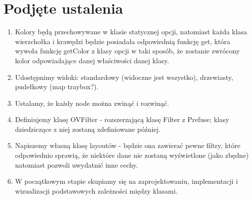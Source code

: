 \documentclass[a4paper,10pt]{article}
\begin{document}
\section{Podjęte ustalenia}
\begin{enumerate}
\item Kolory będą przechowywane w klasie statycznej opcji, natomiast każda klasa wierzchołka i krawędzi będzie posiadała odpowiednią funkcję get, która wywoła funkcję getColor z klasy opcji w taki sposób, że zostanie zwrócony kolor odpowiadające danej właściwości danej klasy. 
\item Udostępnimy widoki: standardowy (widoczne jest wszystko), drzewiasty, pudełkowy (map traybox?).
\item Ustalamy, że każdy node można zwinąć i rozwinąć.
\item Definiujemy klasę OVFilter - rozszerzającą klasę Filter z Prefuse; klasy dziedziczące z niej zostaną zdefiniowane później.
\item Napiszemy własną klasę layoutów - będzie ona zawierać pewne filtry, które odpowiednio sprawią, że niektóre dane nie zostaną wyświetlone (jako zbędne) natomiast pozwoli uwydatnić inne cechy.
\item W początkowym etapie skupiamy się na zaprojektowaniu, implementacji i wizualizacji podstawowych zależności między klasami.
\end{enumerate}



\clearpage
{}
{}

\end{document}
